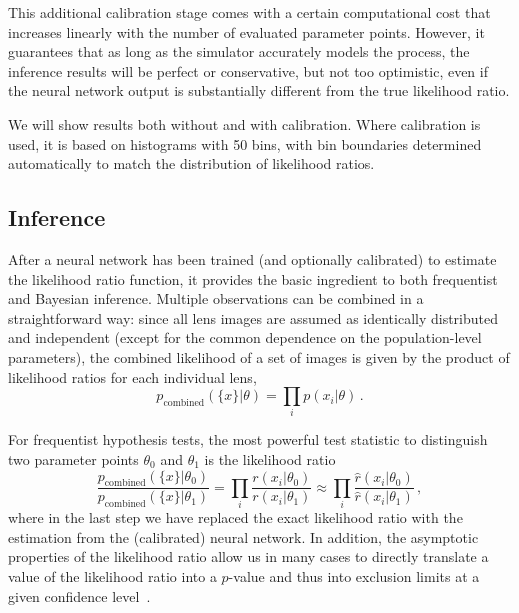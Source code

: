 \documentclass[twocolumn]{aastex63}
\begin{document}
This additional calibration stage comes with a certain computational cost that increases linearly with the number of evaluated parameter points. However, it guarantees that as long as the simulator accurately models the process, the inference results will be perfect or conservative, but not too optimistic, even if the neural network output is substantially different from the true likelihood ratio.

We will show results both without and with calibration. Where calibration is used, it is based on histograms with 50 bins, with bin boundaries determined automatically to match the distribution of likelihood ratios.

\subsection{Inference}
\label{sec:lfi-inference}

After a neural network has been trained (and optionally calibrated) to estimate the likelihood ratio function, it provides the basic ingredient to both frequentist and Bayesian inference. Multiple observations can be combined in a straightforward way: since all lens images are assumed as identically distributed and independent (except for the common dependence on the population-level parameters), the combined likelihood of a set of images is given by the product of likelihood ratios for each individual lens,
%
\begin{equation}
  p_\mathrm{combined}(\{x\}|\theta) = \prod_{i} p(x_i | \theta) \,.
\end{equation}

For frequentist hypothesis tests, the most powerful test statistic to distinguish two parameter points $\theta_0$ and $\theta_1$ is the likelihood ratio~\citep{1933RSPTA.231..289N}
%
\begin{equation}
    \frac{p_\mathrm{combined}(\{x\}|\theta_0)}{p_\mathrm{combined}(\{x\}|\theta_1)} = \prod_{i} \frac{r(x_i | \theta_0)}{r(x_i | \theta_1)} \approx \prod_{i} \frac{\hat{r}(x_i | \theta_0)}{\hat{r}(x_i | \theta_1)} \,,
\end{equation}
%
where in the last step we have replaced the exact likelihood ratio with the estimation from the (calibrated) neural network. In addition, the asymptotic properties of the likelihood ratio allow us in many cases to directly translate a value of the likelihood ratio into a $p$-value and thus into exclusion limits at a given confidence level~\citep{Wilks:1938dza, Wald, Cowan:2010js}.
\end{document}

